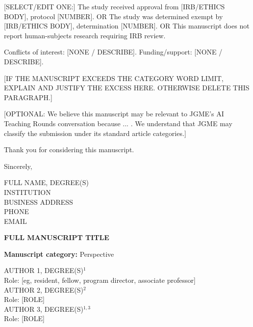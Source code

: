 \documentclass[12pt]{article}
\newcommand{\ManuscriptTitle}{FULL MANUSCRIPT TITLE}
\newcommand{\ManuscriptCategory}{Perspective} %
\newcommand{\CorrespondingAuthor}{FULL NAME, DEGREE(S)}
\newcommand{\CorrespondingInstitution}{INSTITUTION}
\newcommand{\CorrespondingAddress}{BUSINESS ADDRESS}
\newcommand{\CorrespondingPhone}{PHONE}
\newcommand{\CorrespondingEmail}{EMAIL}
\begin{document}
	[SELECT/EDIT ONE:]
The study received approval from [IRB/ETHICS BODY], protocol [NUMBER].
OR
The study was determined exempt by [IRB/ETHICS BODY], determination [NUMBER].
OR
This manuscript does not report human-subjects research requiring IRB review.

Conflicts of interest: [NONE / DESCRIBE].
Funding/support: [NONE / DESCRIBE].

[IF THE MANUSCRIPT EXCEEDS THE CATEGORY WORD LIMIT, EXPLAIN AND JUSTIFY THE
EXCESS HERE. OTHERWISE DELETE THIS PARAGRAPH.]

[OPTIONAL: We believe this manuscript may be relevant to JGME's AI Teaching
Rounds conversation because ... . We understand that JGME may classify the
submission under its standard article categories.]

Thank you for considering this manuscript.

Sincerely,

\CorrespondingAuthor\\
\CorrespondingInstitution\\
\CorrespondingAddress\\
\CorrespondingPhone\\
\CorrespondingEmail

\clearpage


\begin{center}
	{\Large\bfseries \ManuscriptTitle\par}

	\vspace{1em}

	\textbf{Manuscript category:} \ManuscriptCategory

	\vspace{1em}

	AUTHOR 1, DEGREE(S)$^{1}$\\
	Role: [eg, resident, fellow, program director, associate professor]\\[0.5em]

	AUTHOR 2, DEGREE(S)$^{2}$\\
	Role: [ROLE]\\[0.5em]

	AUTHOR 3, DEGREE(S)$^{1,3}$\\
	Role: [ROLE]
\end{center}
\end{document}
